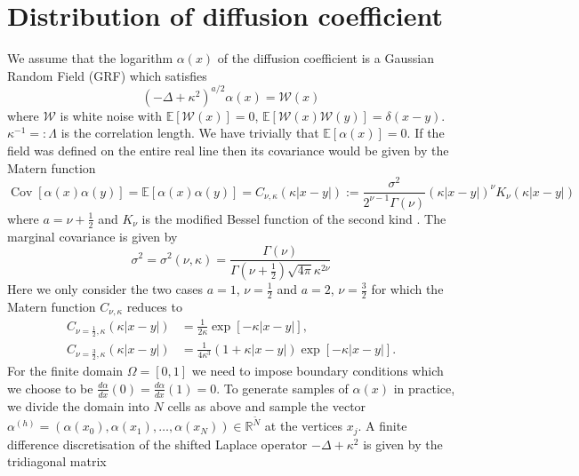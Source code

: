\documentclass[11pt]{article}
\begin{document}
\section{Distribution of diffusion coefficient}
We assume that the logarithm $\alpha(x)$ of the diffusion coefficient is a Gaussian Random Field (GRF) which satisfies
\begin{equation}
    (-\Delta + \kappa^2)^{a/2}\alpha(x) = \mathcal{W}(x)
\end{equation}
where $\mathcal{W}$ is white noise with $\mathbb{E}[\mathcal{W}(x)]=0$, $\mathbb{E}[\mathcal{W}(x)\mathcal{W}(y)] = \delta(x-y)$. $\kappa^{-1}=:\Lambda$ is the correlation length. We have trivially that $\mathbb{E}[\alpha(x)]=0$. If the field was defined on the entire real line then its covariance would be given by the Matern function
\begin{equation}
    \operatorname{Cov}[\alpha(x)\alpha(y)]=\mathbb{E}[\alpha(x)\alpha(y)] = C_{\nu,\kappa}(\kappa |x-y|):=\frac{\sigma^2}{2^{\nu-1}\Gamma(\nu)}\left(\kappa |x-y|\right)^\nu K_\nu(\kappa|x-y|) 
\end{equation}
where $a = \nu+\frac{1}{2}$ and $K_\nu$ is the modified Bessel function of the second kind \cite{lindgren2011explicit}.
The marginal covariance is given by
\begin{equation}
    \sigma^2 = \sigma^2(\nu,\kappa) = \frac{\Gamma(\nu)}{\Gamma(\nu+\frac{1}{2})\sqrt{4\pi}\kappa^{2\nu}}
\end{equation}
Here we only consider the two cases $a=1$, $\nu=\frac{1}{2}$ and $a=2$, $\nu=\frac{3}{2}$ for which the Matern function $C_{\nu,\kappa}$ reduces to 
\begin{equation}
\begin{aligned}
        C_{\nu=\frac{1}{2},\kappa}(\kappa|x-y|) &= \frac{1}{2\kappa}\exp[-\kappa|x-y|],\\
        C_{\nu=\frac{3}{2},\kappa}(\kappa|x-y|) &= \frac{1}{4\kappa^3}\left(1+\kappa|x-y|\right)\exp[-\kappa|x-y|].
\end{aligned}
\end{equation}
For the finite domain $\Omega=[0,1]$ we need to impose boundary conditions which we choose to be $\frac{d\alpha}{dx}(0)=\frac{d\alpha}{dx}(1)=0$. To generate samples of $\alpha(x)$ in practice, we divide the domain into $N$ cells as above and sample the vector $\alpha^{(h)}=(\alpha(x_0),\alpha(x_1),\dots,\alpha(x_N))\in\mathbb{R}^{\widetilde{N}}$ at the vertices $x_j$. A finite difference discretisation of the shifted Laplace operator $-\Delta + \kappa^2$ is given by the tridiagonal matrix
\end{document}
